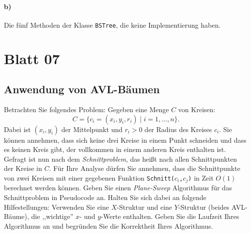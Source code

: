 \documentclass[paper=a4, fontsize=11pt]{scrartcl}
\numberwithin{equation}{section}
\numberwithin{figure}{section}
\numberwithin{table}{section}
\begin{document}
\paragraph{b)} 
Die fünf Methoden der Klasse \texttt{BSTree}, die keine Implementierung haben.

\newpage
\section{Blatt 07}
\subsection{Anwendung von AVL-Bäumen}
Betrachten Sie folgendes Problem: Gegeben eine Menge $C$ von Kreisen:
\[ C = \{c_i = (x_i,y_i, r_i) \mid i = 1,\dots,n \}. \]
Dabei ist $(x_i,y_i)$ der Mittelpunkt und $r_i>0$ der Radius des Kreises $c_i$.
Sie können annehmen, dass sich keine drei Kreise in einem Punkt schneiden und dass es keinen Kreis gibt,
der vollkommen in einem anderen Kreis enthalten ist.
Gefragt ist nun nach dem \textit{Schnittproblem}, das heißt nach allen Schnittpunkten
der Kreise in $C$. Für Ihre Analyse dürfen Sie annehmen, dass die Schnittpunkte von
zwei Kreisen mit einer gegebenen Funktion \texttt{Schnitt($c_i$,$c_j$)} in Zeit $O(1)$ berechnet werden können.
Geben Sie einen \textit{Plane-Sweep} Algorithmus für das Schnittproblem in Pseudocode an.
Halten Sie sich dabei an folgende Hilfestellungen: Verwenden Sie eine $X$-Struktur
und eine $Y$-Struktur (beides AVL-Bäume), die ,,wichtige'' $x$- und $y$-Werte enthalten.
Geben Sie die Laufzeit Ihres Algorithmus an und begründen Sie die Korrektheit Ihres Algorithmus. \\
\end{document}
